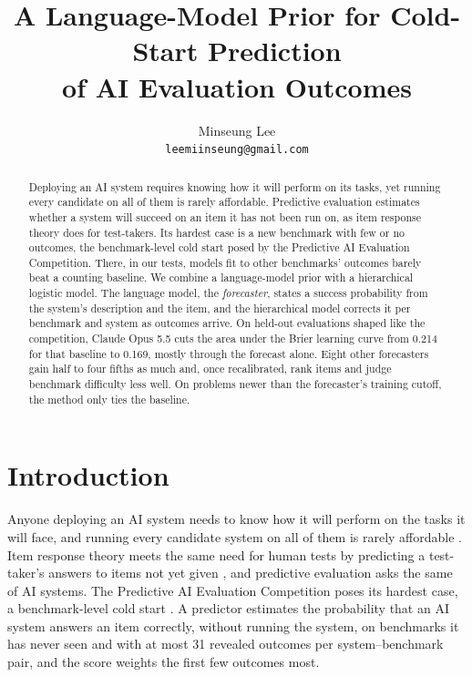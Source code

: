 \documentclass{article}
\title{A Language-Model Prior for Cold-Start Prediction\\of AI Evaluation Outcomes}
\author{%
  Minseung Lee \\
  \texttt{leemiinseung@gmail.com} \\
}
\begin{document}
\maketitle

\begin{abstract}
Deploying an AI system requires knowing how it will perform on its tasks, yet running every candidate on all of them is rarely affordable. Predictive evaluation estimates whether a system will succeed on an item it has not been run on, as item response theory does for test-takers. Its hardest case is a new benchmark with few or no outcomes, the benchmark-level cold start posed by the Predictive AI Evaluation Competition. There, in our tests, models fit to other benchmarks' outcomes barely beat a counting baseline. We combine a language-model prior with a hierarchical logistic model. The language model, the \emph{forecaster}, states a success probability from the system's description and the item, and the hierarchical model corrects it per benchmark and system as outcomes arrive. On held-out evaluations shaped like the competition, Claude Opus 5.5 cuts the area under the Brier learning curve from 0.214 for that baseline to 0.169, mostly through the forecast alone. Eight other forecasters gain half to four fifths as much and, once recalibrated, rank items and judge benchmark difficulty less well. On problems newer than the forecaster's training cutoff, the method only ties the baseline.
\end{abstract}
\suppressfloats[t]

\section{Introduction}

Anyone deploying an AI system needs to know how it will perform on the tasks it will face, and running every candidate system on all of them is rarely affordable \cite{zhou2026adele, paiec2026}. Item response theory meets the same need for human tests by predicting a test-taker's answers to items not yet given \cite{lord1980irt}, and predictive evaluation asks the same of AI systems. The Predictive AI Evaluation Competition poses its hardest case, a benchmark-level cold start \cite{paiec2026}. A predictor estimates the probability that an AI system answers an item correctly, without running the system, on benchmarks it has never seen and with at most 31 revealed outcomes per system--benchmark pair, and the score weights the first few outcomes most.
\end{document}
